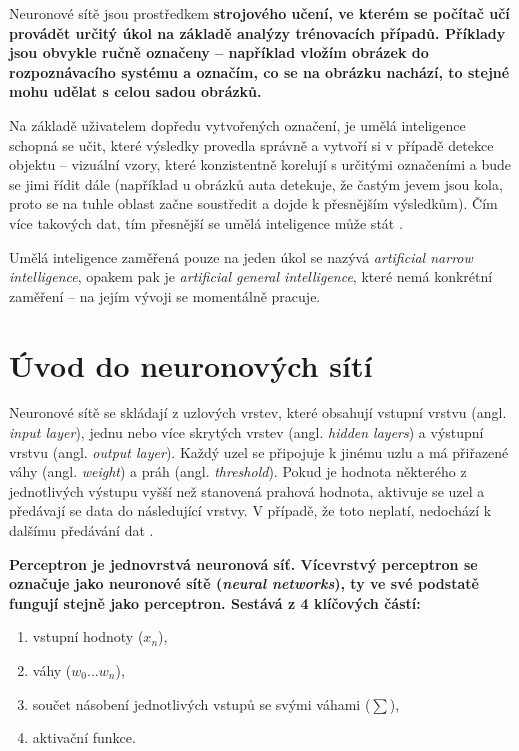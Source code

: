 \bigskip

\noindent Neuronové sítě jsou prostředkem \bf strojového učení\rm, ve kterém se počítač učí provádět určitý úkol na základě analýzy trénovacích případů. Příklady jsou obvykle ručně označeny -- například vložím obrázek do rozpoznávacího systému a označím, co se na obrázku nachází, to stejné mohu udělat s celou sadou obrázků. 

Na základě uživatelem dopředu vytvořených označení, je umělá inteligence schopná se učit, které výsledky provedla správně a vytvoří si v případě detekce objektu -- vizuální vzory, které konzistentně korelují s určitými označeními a bude se jimi řídit dále (například u obrázků auta detekuje, že častým jevem jsou kola, proto se na tuhle oblast začne soustředit a dojde k přesnějším výsledkům). Čím více takových dat, tím přesnější se umělá inteligence může stát \cite{MITNN}.

Umělá inteligence zaměřená pouze na jeden úkol se nazývá \textit{artificial narrow intelligence}, opakem pak je \textit{artificial general intelligence}, které nemá konkrétní zaměření -- na jejím vývoji se momentálně pracuje.

\section{Úvod do neuronových sítí}
\label{neural-intro}

Neuronové sítě se skládají z uzlových vrstev, které obsahují vstupní vrstvu (angl. \textit{input layer}), jednu nebo více skrytých vrstev (angl. \textit{hidden layers}) a výstupní vrstvu (angl. \textit{output layer}). Každý uzel se připojuje k jinému uzlu a má přiřazené váhy (angl. \textit{weight}) a práh (angl. \textit{threshold}). Pokud je hodnota některého z jednotlivých výstupu vyšší než stanovená prahová hodnota, aktivuje se uzel a předávají se data do následující vrstvy. V případě, že toto neplatí, nedochází k dalšímu předávání dat \cite{IBMANN}. 

\bigskip

\noindent \bf Perceptron \rm \cite{Perceptron} je jednovrstvá neuronová síť. Vícevrstvý perceptron se označuje jako neuronové sítě (\textit{neural networks}), ty ve své podstatě fungují stejně jako perceptron. Sestává z 4 klíčových částí:

\begin{enumerate}
    \item vstupní hodnoty ($x_{n}$),
    \item váhy ($w_{0}...w_{n}$),
    \item součet násobení jednotlivých vstupů se svými váhami ($\sum$),
    \item aktivační funkce.
\end{enumerate}

